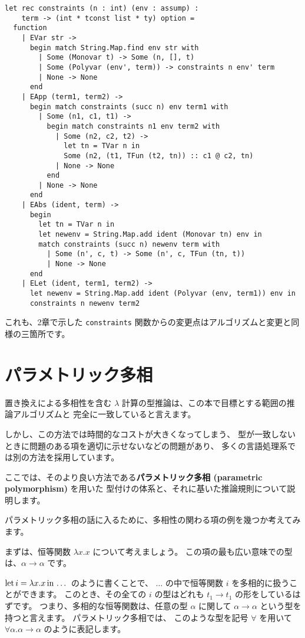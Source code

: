 \begin{lstlisting}[caption=制約の生成, label=list:ocaml-poly-constraints]
let rec constraints (n : int) (env : assump) :
    term -> (int * tconst list * ty) option =
  function
    | EVar str ->
      begin match String.Map.find env str with
        | Some (Monovar t) -> Some (n, [], t)
        | Some (Polyvar (env', term)) -> constraints n env' term
        | None -> None
      end
    | EApp (term1, term2) ->
      begin match constraints (succ n) env term1 with
        | Some (n1, c1, t1) ->
          begin match constraints n1 env term2 with
            | Some (n2, c2, t2) ->
              let tn = TVar n in
              Some (n2, (t1, TFun (t2, tn)) :: c1 @ c2, tn)
            | None -> None
          end
        | None -> None
      end
    | EAbs (ident, term) ->
      begin
        let tn = TVar n in
        let newenv = String.Map.add ident (Monovar tn) env in
        match constraints (succ n) newenv term with
          | Some (n', c, t) -> Some (n', c, TFun (tn, t))
          | None -> None
      end
    | ELet (ident, term1, term2) ->
      let newenv = String.Map.add ident (Polyvar (env, term1)) env in
      constraints n newenv term2
\end{lstlisting}

これも、2章で示した \texttt{constraints} 関数からの変更点はアルゴリズムと変更と同様の三箇所です。

\section{パラメトリック多相}

置き換えによる多相性を含む $\lambda$ 計算の型推論は、この本で目標とする範囲の推論アルゴリズムと
完全に一致していると言えます。

しかし、この方法では時間的なコストが大きくなってしまう、
型が一致しないときに問題のある項を適切に示せないなどの問題があり、
多くの言語処理系では別の方法を採用しています。

ここでは、そのより良い方法である\textbf{パラメトリック多相 (parametric polymorphism)} を用いた
型付けの体系と、それに基いた推論規則について説明します。

パラメトリック多相の話に入るために、多相性の関わる項の例を幾つか考えてみます。

まずは、恒等関数 $\lambda x . x$ について考えましょう。
この項の最も広い意味での型は、$\alpha \to \alpha$ です。

$\mathrm{let} \, i = \lambda x . x \, \mathrm{in} \, \dots$ のように書くことで、
$\dots$ の中で恒等関数 $i$ を多相的に扱うことができます。
このとき、その全ての $i$ の型はどれも $t_1 \to t_1$ の形をしているはずです。
つまり、多相的な恒等関数は、任意の型 $\alpha$ に関して $\alpha \to \alpha$ という型を持つと言えます。
パラメトリック多相では、
このような型を記号 $\forall$ を用いて $\forall \alpha . \alpha \to \alpha$ のように表記します。

